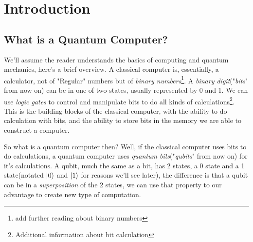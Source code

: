 \documentclass[english, a4paper, 12pt, twoside]{article}
\numberwithin{equation}{section} %
\begin{document}
\section{Introduction}
\subsection{What is a Quantum Computer?}
We'll assume the reader understands the basics of computing and quantum mechanics, here's a brief overview. \newline
 A classical computer is, essentially, a calculator, not of "Regular" numbers but of \textit{binary numbers}\footnote{ add further reading about binary numbers}. %
 A \textit{binary digit}("\textit{bits}" from now on) can be in one of two states, usually represented by 0 and 1. We can use \textit{logic gates} to control and manipulate bits to do all kinds of calculations\footnote{Additional information about bit calculation}. This is the building blocks of the classical computer, with the ability to do calculation with bits, and the ability to store bits in the memory we are able to construct a computer.
 
So what is a quantum computer then? Well, if the classical computer uses bits to do calculations, a quantum computer uses \textit{quantum bits}("\textit{qubits}" from now on) for it's calculations. A qubit, much the same as a bit, has 2 states, a 0 state and a 1 state(notated $\ket{0}$ and $\ket{1}$ for reasons we'll see later), the difference is that a qubit can be in a \textit{superposition} of the 2 states, we can use that property to our advantage to create new type of computation.
\end{document}
